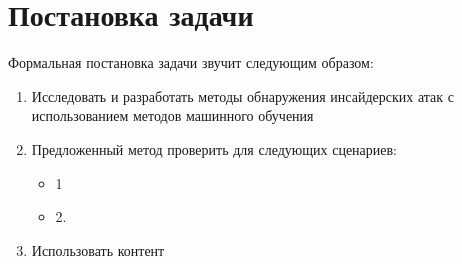 \section{Постановка задачи}
Формальная постановка задачи звучит следующим образом:
\begin{enumerate}
\item Исследовать и разработать методы обнаружения инсайдерских атак с использованием методов машинного обучения
\item Предложенный метод проверить для следующих сценариев:
\begin{itemize}
\item 1
\item 2.
\end{itemize}
\item Использовать контент
\end{enumerate}
\clearpage